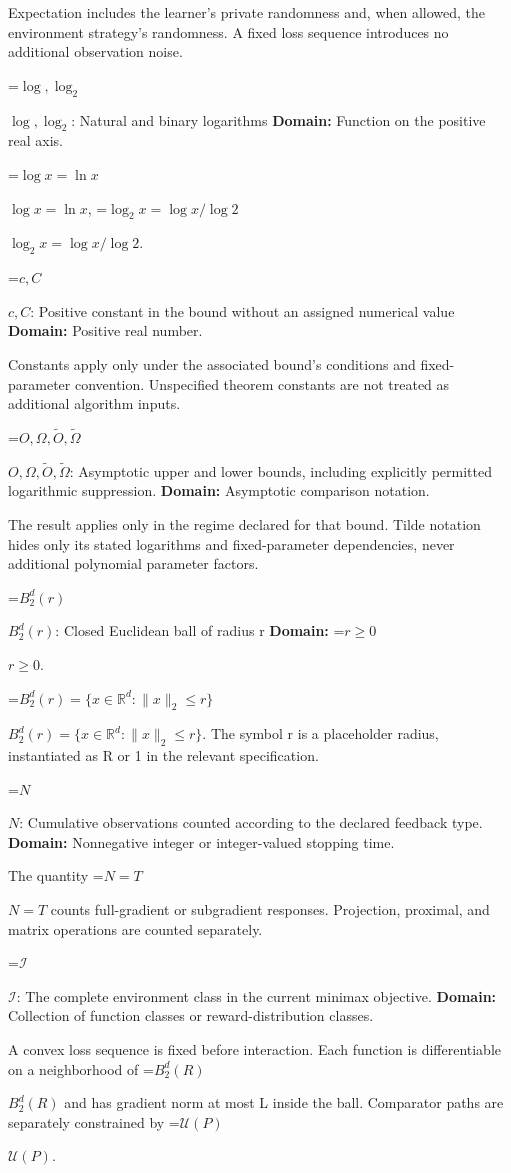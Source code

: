 \documentclass[10pt,a4paper]{article}
\newcommand{\AtlasMath}[1]{\par\begingroup\centering\setbox0=\hbox{$\displaystyle #1$}\ifdim\wd0>1.4\linewidth\typeout{ATLAS WIDE FORMULA: \the\wd0}\fi\ifdim\wd0>\linewidth\resizebox{\linewidth}{!}{\box0}\else\box0\fi\par\endgroup}
\newcommand{\AtlasInlineMath}[1]{\begingroup\setbox0=\hbox{$#1$}\ifdim\wd0>.4\linewidth\endgroup\AtlasMath{#1}\else\endgroup$#1$\fi}
\begin{document}
Expectation includes the learner's private randomness and, when allowed, the environment strategy's randomness. A fixed loss sequence introduces no additional observation noise.

\AtlasInlineMath{\log,\log_2}: Natural and binary logarithms \textbf{Domain:} Function on the positive real axis.

\AtlasInlineMath{\log x=\ln x}, \AtlasInlineMath{\log_2x=\log x/\log2}.

\AtlasInlineMath{c,C}: Positive constant in the bound without an assigned numerical value \textbf{Domain:} Positive real number.

Constants apply only under the associated bound’s conditions and fixed-parameter convention. Unspecified theorem constants are not treated as additional algorithm inputs.

\AtlasInlineMath{O,\Omega,\widetilde O,\widetilde\Omega}: Asymptotic upper and lower bounds, including explicitly permitted logarithmic suppression. \textbf{Domain:} Asymptotic comparison notation.

The result applies only in the regime declared for that bound. Tilde notation hides only its stated logarithms and fixed-parameter dependencies, never additional polynomial parameter factors.

\AtlasInlineMath{B_2^d(r)}: Closed Euclidean ball of radius r \textbf{Domain:} \AtlasInlineMath{r\ge0}.

\AtlasInlineMath{B_2^d(r)=\{x\in\mathbb R^d:\|x\|_2\le r\}}. The symbol r is a placeholder radius, instantiated as R or 1 in the relevant specification.

\AtlasInlineMath{N}: Cumulative observations counted according to the declared feedback type. \textbf{Domain:} Nonnegative integer or integer-valued stopping time.

The quantity \AtlasInlineMath{N=T} counts full-gradient or subgradient responses. Projection, proximal, and matrix operations are counted separately.

\AtlasInlineMath{\mathcal I}: The complete environment class in the current minimax objective. \textbf{Domain:} Collection of function classes or reward-distribution classes.

A convex loss sequence is fixed before interaction. Each function is differentiable on a neighborhood of \AtlasInlineMath{B_2^d(R)} and has gradient norm at most L inside the ball. Comparator paths are separately constrained by \AtlasInlineMath{\mathcal U(P)}.
\end{document}
